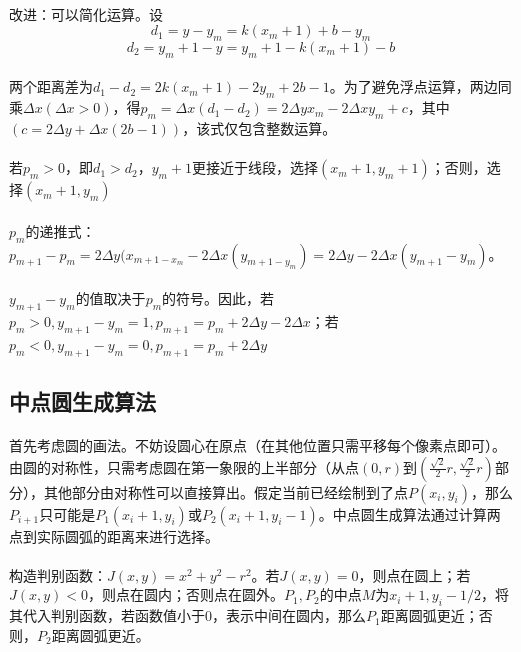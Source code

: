 \documentclass[a4paper,UTF8]{article}
\theoremstyle{definition}
\begin{document}
\paragraph{}改进：可以简化运算。设\\
$$d_1=y-y_m=k(x_m+1)+b-y_m$$
$$d_2=y_m+1-y=y_m+1-k(x_m+1)-b$$
\paragraph{}两个距离差为$d_1-d_2=2k(x_m+1)-2y_m+2b-1$。为了避免浮点运算，两边同乘$\Delta x(\Delta x>0)$，得$p_m=\Delta x(d_1-d_2)=2\Delta yx_m-2\Delta xy_m+c$，其中$(c=2\Delta y+\Delta x(2b-1))$，该式仅包含整数运算。
\paragraph{}若$p_m>0$，即$d_1>d_2$，$y_m+1$更接近于线段，选择$(x_m+1,y_m+1)$；否则，选择$(x_m+1,y_m)$
\paragraph{} $p_m$的递推式：$p_{m+1}-p_m=2\Delta y(x_{m+1-x_m}-2\Delta x(y_{m+1-y_m})=2\Delta y-2\Delta x(y_{m+1}-y_m)$。
\paragraph{} $y_{m+1}-y_m$的值取决于$p_m$的符号。因此，若$p_m>0,y_{m+1}-y_m=1,p_{m+1}=p_m+2\Delta y-2\Delta x$；若$p_m<0,y_{m+1}-y_m=0,p_{m+1}=p_m+2\Delta y$
\subsection{中点圆生成算法}
\paragraph{}首先考虑圆的画法。不妨设圆心在原点（在其他位置只需平移每个像素点即可）。由圆的对称性，只需考虑圆在第一象限的上半部分（从点$(0,r)$到$(\frac{\sqrt{2}}{2}r,\frac{\sqrt{2}}{2}r)$部分），其他部分由对称性可以直接算出。假定当前已经绘制到了点$P(x_i,y_i)$，那么$P_{i+1}$只可能是$P_1(x_i+1,y_i)$或$P_2(x_i+1,y_i-1)$。中点圆生成算法通过计算两点到实际圆弧的距离来进行选择。
\paragraph{}构造判别函数：$J(x,y)=x^2+y^2-r^2$。若$J(x,y)=0$，则点在圆上；若$J(x,y)<0$，则点在圆内；否则点在圆外。$P_1,P_2$的中点$M$为$x_i+1,y_i-1/2$，将其代入判别函数，若函数值小于0，表示中间在圆内，那么$P_1$距离圆弧更近；否则，$P_2$距离圆弧更近。
\end{document}
